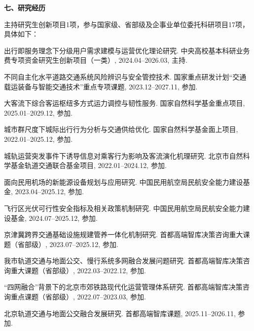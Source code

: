 \vspace{10pt}
\textbf{七、研究经历}
\vspace{5pt}

主持研究生创新项目1项，参与国家级、省部级及企事业单位委托科研项目17项，具体如下：

\begin{enumerate}[leftmargin=*, parsep=5pt, label={[\arabic*]}]

	\item 出行即服务理念下分级用户需求建模与运营优化理论研究. 中央高校基本科研业务费专项资金研究生创新项目（一类）, 2024.04--2026.03, 主持.

	\item 不同自主化水平道路交通系统风险辨识与安全管控技术. 国家重点研发计划“交通载运装备与智能交通技术”重点专项课题, 2023.12--2027.11, 参加.

	\item 大客流下综合客运枢纽多方式运力调控与韧性服务. 国家自然科学基金重点项目, 2025.01--2029.12, 参加.

	\item 城市群尺度下城际出行行为分析与交通供给优化. 国家自然科学基金面上项目, 2022.01--2025.12, 参加.

	\item 城轨运营突发事件下诱导信息对乘客行为影响及客流演化机理研究. 北京市自然科学基金轨道交通联合基金项目, 2022.01--2024.12, 参加.

	\item 面向民用机场的新能源设备规划与应用研究. 中国民用航空局民航安全能力建设基金, 2023.04--2025.12, 参加.

	\item 飞行区光伏可行性安全指标及相关政策机制研究. 中国民用航空局民航安全能力建设基金, 2024.07--2025.12, 参加.
	
	\item 京津冀跨界交通基础设施规建管养一体化机制研究. 首都高端智库决策咨询重大课题（省部级）, 2023.07--2025.12, 参加.

	\item 我市轨道交通与地面公交、慢行系统多网融合发展问题研究. 首都高端智库决策咨询重大课题（省部级）, 2022.03--2022.12, 参加.

	\item “四网融合”背景下的北京市郊铁路现代化运营管理体系研究. 首都高端智库决策咨询重点课题（省部级）, 2022.07--2023.03, 参加.

	\item 北京轨道交通与地面公交融合发展研究. 首都高端智库课题, 2025.11--2026.11, 参加.


\end{enumerate}
